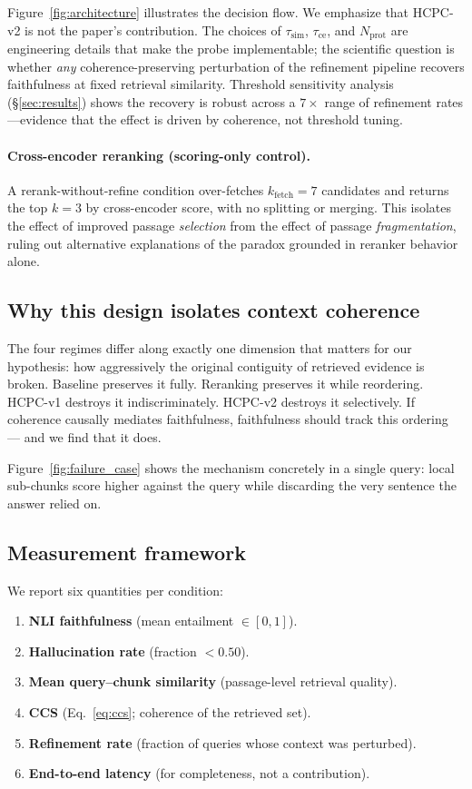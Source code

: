 
Figure~\ref{fig:architecture} illustrates the decision flow. We emphasize
that HCPC-v2 is not the paper's contribution. The choices of
$\tau_{\text{sim}}$, $\tau_{\text{ce}}$, and $N_{\text{prot}}$ are
engineering details that make the probe implementable; the scientific
question is whether \emph{any} coherence-preserving perturbation of the
refinement pipeline recovers faithfulness at fixed retrieval similarity.
Threshold sensitivity analysis (\S\ref{sec:results}) shows the recovery is
robust across a $7\times$ range of refinement rates---evidence that the
effect is driven by coherence, not threshold tuning.

\paragraph{Cross-encoder reranking (scoring-only control).}
A rerank-without-refine condition over-fetches $k_{\text{fetch}}{=}7$
candidates and returns the top $k{=}3$ by cross-encoder score, with no
splitting or merging. This isolates the effect of improved passage
\emph{selection} from the effect of passage \emph{fragmentation}, ruling
out alternative explanations of the paradox grounded in reranker behavior
alone.

\subsection{Why this design isolates context coherence}

The four regimes differ along exactly one dimension that matters for our
hypothesis: how aggressively the original contiguity of retrieved
evidence is broken. Baseline preserves it fully. Reranking preserves it
while reordering. HCPC-v1 destroys it indiscriminately. HCPC-v2 destroys
it selectively. If coherence causally mediates faithfulness,
faithfulness should track this ordering — and we find that it does.


Figure~\ref{fig:failure_case} shows the mechanism concretely in a single
query: local sub-chunks score higher against the query while discarding the
very sentence the answer relied on.

\subsection{Measurement framework}

We report six quantities per condition:
\begin{enumerate}
  \item \textbf{NLI faithfulness} (mean entailment $\in[0,1]$).
  \item \textbf{Hallucination rate} (fraction $<0.50$).
  \item \textbf{Mean query--chunk similarity} (passage-level retrieval
        quality).
  \item \textbf{CCS} (Eq.~\ref{eq:ccs}; coherence of the retrieved set).
  \item \textbf{Refinement rate} (fraction of queries whose context was
        perturbed).
  \item \textbf{End-to-end latency} (for completeness, not a contribution).
\end{enumerate}


